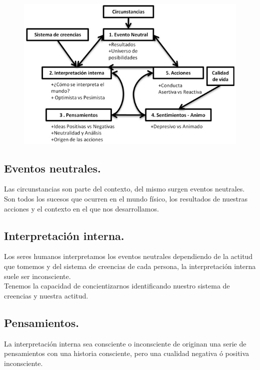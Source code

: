 \documentclass[10pt]{article}
\begin{document}
\begin{figure}[htbp!]
	\begin{center}
		\includegraphics[scale = 1.0]{Imagen/Toma_de_decisiones.jpg}
	\end{center}
\end{figure}

\subsection{ Eventos neutrales.}

Las circunstancias son parte del contexto, del mismo surgen eventos neutrales. Son todos los sucesos que ocurren en el mundo físico, los resultados de nuestras acciones y el contexto en el que nos desarrollamos.

\subsection{ Interpretación interna.}

Los seres humanos interpretamos los eventos neutrales dependiendo de la actitud que tomemos y del sistema de creencias de cada persona, la interpretación interna suele ser inconsciente.\\

Tenemos la capacidad de concientizarnos identificando nuestro sistema de creencias y nuestra actitud.

\subsection{ Pensamientos.}

La interpretación interna sea consciente o inconsciente de originan una serie de pensamientos con una historia consciente, pero una cualidad negativa ó positiva inconsciente. \\
\end{document}
